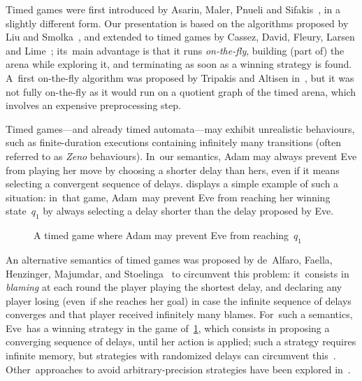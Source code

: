 Timed games were first introduced by Asarin, Maler, Pnueli and Sifakis~\cite{MPS95,AMPS98}, in a
slightly different form.  Our presentation is based on the algorithms
proposed by Liu and Smolka~\cite{LS98}, and extended to timed games by
Cassez, David, Fleury, Larsen and Lime~\cite{CDFLL05};
its~main advantage is that it runs \emph{on-the-fly}, building (part
of) the arena while exploring it, and terminating as soon as a winning
strategy is found.  A~first on-the-fly algorithm was proposed by Tripakis and Altisen
in~\cite{TA99}, but it was not fully on-the-fly as it would run on a
quotient graph of the timed arena, which involves an expensive
preprocessing step.

Timed games---and already timed automata---may exhibit unrealistic
behaviours, such as finite-duration executions containing infinitely
many transitions (often referred to as \emph{Zeno} behaviours).
In~our semantics, Adam may always prevent Eve from playing her move
by choosing a shorter delay than hers, even if it means selecting a convergent
sequence of delays.  displays a simple example of
such a situation: in~that game, Adam~may prevent Eve from reaching her
winning state~$q_1$ by always selecting a delay shorter than the delay
proposed by Eve.

\begin{figure}[ht]
  \centering
  \caption{A timed game where Adam may prevent Eve from reaching~$q_1$}
  \label{9-fig:exzeno}
\end{figure}

An alternative semantics of timed games was proposed by de~Alfaro,
Faella, Henzinger, Majumdar, and Stoelinga~\cite{AFHMS03} to
circumvent this problem: it~consists in \emph{blaming} at each round
the player playing the shortest delay, and declaring any player losing
(even~if she reaches her goal) in case the infinite sequence of delays
converges and that player received infinitely many blames.  For~such a
semantics, Eve~has a winning strategy in the game
of~\cref{9-fig:exzeno}, which consists in proposing a converging
sequence of delays, until her action is applied; such a strategy
requires infinite memory, but strategies with randomized delays can
circumvent this~\cite{CHP08}. Other~approaches to avoid
arbitrary-precision strategies have been explored
in~\cite{BMS15,BFM15,LLTW14,ORS14}.

